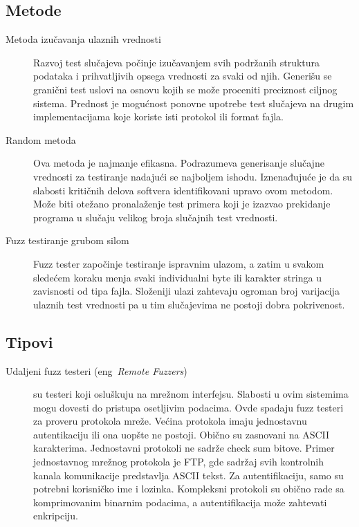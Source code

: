 \documentclass[a4paper]{article}
\begin{document}
{\subsection{Metode}
\label{subsec:metode_fuzz_testiranja}
\begin{description}
\item[Metoda izučavanja ulaznih vrednosti] 
Razvoj test slučajeva počinje izučavanjem svih podržanih struktura podataka i prihvatljivih opsega vrednosti za svaki od njih. Generišu se granični test uslovi na osnovu kojih se može proceniti preciznost ciljnog sistema. Prednost je mogućnost ponovne upotrebe test slučajeva na drugim implementacijama koje koriste isti protokol ili format fajla.
\\

\item[Random metoda]
Ova metoda je najmanje efikasna. Podrazumeva generisanje slučajne vrednosti za testiranje nadajući se najboljem ishodu. Iznenađujuće je da su slabosti kritičnih delova softvera identifikovani upravo ovom metodom. Može biti otežano pronalaženje test primera koji je izazvao 
prekidanje programa u slučaju velikog broja slučajnih test vrednosti. 
\\

\item[Fuzz testiranje grubom silom]
Fuzz tester započinje testiranje ispravnim ulazom, a zatim u svakom sledećem koraku menja svaki individualni byte ili karakter stringa u zavisnosti od tipa fajla. Složeniji ulazi zahtevaju ogroman broj varijacija ulaznih test vrednosti pa u tim slučajevima ne postoji dobra pokrivenost.
\end{description}

\subsection{Tipovi}
\label{subsec:tipovi_fuzz_testiranja}
\begin{description}
\item[Udaljeni fuzz testeri  (eng~{\em Remote Fuzzers}) ] su testeri koji osluškuju na mrežnom interfejsu. Slabosti u ovim sistemima mogu dovesti do pristupa osetljivim podacima. Ovde spadaju fuzz testeri za proveru protokola mreže. Većina protokola
imaju jednostavnu autentikaciju ili ona uopšte ne postoji. Obično su zasnovani na ASCII karakterima. Jednostavni protokoli ne sadrže check sum bitove. Primer jednostavnog mrežnog protokola je FTP, gde sadržaj svih kontrolnih kanala komunikacije predstavlja ASCII tekst. Za autentifikaciju, samo su potrebni korisničko ime i lozinka.
Kompleksni protokoli su obično rade sa komprimovanim binarnim podacima, a autentifikacija može zahtevati enkripciju.
\\


\end{description}}
\end{document}
